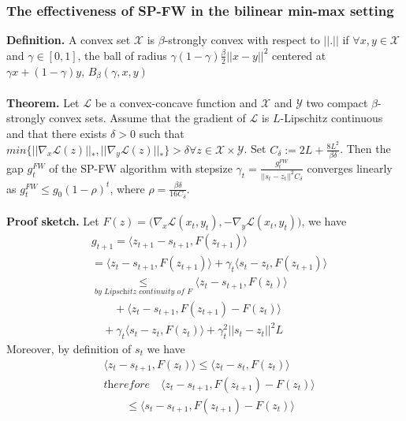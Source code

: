 \documentclass{article}
\begin{document}
\subsubsection{The effectiveness of SP-FW in the bilinear min-max setting}
\textbf{Definition.} A convex set $\mathcal{X}$ is $\beta$-strongly convex with respect to $||.||$ if $\forall x,y\in\mathcal{X}$ and $\gamma\in[0,1]$, the ball of radius $\gamma(1-\gamma)\frac{\beta}{2}||x- y||^2$ centered at $\gamma x+ (1-\gamma)y$, $B_{\beta}(\gamma,x,y)$\\
\\
\textbf{Theorem.} Let $\mathcal{L}$ be a convex-concave function and $\mathcal{X}$ and $\mathcal{Y}$ two compact $\beta$-strongly convex sets. Assume that the gradient of $\mathcal{L}$ is $L$-Lipschitz continuous and that there exists $\delta > 0$ such that $\textit{min}\{||\nabla_{x}\mathcal{L}(z)||_{*},||\nabla_{y}\mathcal{L}(z)||_{*}\} > \delta \forall z\in\mathcal{X}\times\mathcal{Y}$. Set $C_{\delta}:= 2L+ \frac{8L^{2}}{\beta\delta}$. Then the gap $g_{t}^{FW}$ of the SP-FW algorithm with stepsize $\gamma_{t}=\frac{g_{t}^{FW}}{||s_{t}-z_{t}||^{2}C_{\delta}}$ converges linearly as $g_{t}^{FW}\leq g_{0}(1-\rho)^{t}$, where $\rho= \frac{\beta\delta}{16C_{\delta}}$.\\
\\
\textbf{Proof sketch.} Let $F(z)= \Big(\nabla_{x} \mathcal{L}(x_{t},y_{t}), -\nabla_{y} \mathcal{L}(x_{t},y_{t})\Big)$, we have
\begin{equation*}
\begin{aligned}
    &g_{t+1}=\langle z_{t+1}- s_{t+1}, F(z_{t+1}) \rangle\\
    &= \langle z_{t}- s_{t+1}, F(z_{t+1})\rangle+ \gamma_{t}\langle s_{t}- z_{t}, F(z_{t+1})\rangle\\
    &\underset{\textit{by Lipschitz continuity of $F$}}{\leq} \langle z_{t}- s_{t+1}, F(z_{t})\rangle\\
    &\quad\quad+ \langle z_{t}- s_{t+1}, F(z_{t+1})- F(z_{t})\rangle\\
    &\quad+ \gamma_{t}\langle s_{t}- z_{t}, F(z_{t})\rangle+ \gamma_{t}^{2}||s_{t}-z_{t}||^{2}L
\end{aligned}
\end{equation*}
Moreover, by definition of $s_{t}$ we have \begin{equation*}
\begin{aligned}
    &\langle z_{t}- s_{t+1}, F(z_{t})\rangle \leq \langle z_{t}- s_{t}, F(z_{t})\rangle\\
    &\textit{therefore}\quad \langle z_{t}- s_{t+1}, F(z_{t+1})- F(z_{t})\rangle\\
    &\quad\quad\leq \langle s_{t}- s_{t+1}, F(z_{t+1})- F(z_{t})\rangle
\end{aligned}
\end{equation*}
\end{document}
